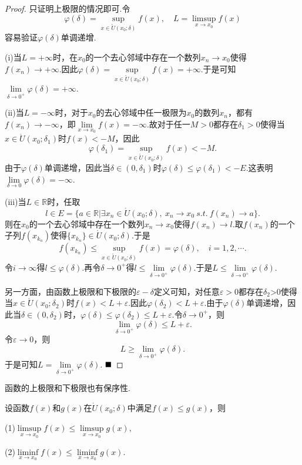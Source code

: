 \begin{proof}
	只证明上极限的情况即可.令
	$$\varphi(\delta)=\sup\limits_{x\in \mathring{U}(x_0;\delta)}f(x),\quad L=\limsup\limits_{x\to x_0}f(x)$$
	容易验证$\varphi(\delta)$单调递增.
	
	(i)当$L=+\infty$时，在$x_0$的一个去心邻域中存在一个数列$x_n\to x_0$使得$f(x_n)\to +\infty$.因此$\varphi(\delta)=\sup\limits_{x\in \mathring{U}(x_0;\delta)}f(x)=+\infty$.于是可知$\lim\limits_{\delta\to 0^+}\varphi(\delta)=+\infty$.
	
	(ii)当$L=-\infty$时，对于$x_0$的去心邻域中任一极限为$x_0$的数列$x_n$，都有$f(x_n)\to -\infty$，即$\lim\limits_{x\to x_0}f(x)=-\infty$.故对于任一$M>0$都存在$\delta_1>0$使得当$x\in\mathring{U}(x_0;\delta_1)$时$f(x)<-M$，因此
	$$\varphi(\delta_1)=\sup\limits_{x\in \mathring{U}(x_0;\delta)}f(x)<-M.$$
	由于$\varphi(\delta)$单调递增，因此当$\delta\in(0,\delta_1)$时$\varphi(\delta)\leqslant\varphi(\delta_1)<-E$.这表明$\lim\limits_{\delta\to 0}\varphi(\delta)=-\infty$.
	
	(iii)当$L\in\mathbb{R}$时，任取
	$$l\in E=\{a\in\mathbb{R}|\exists x_n\in\mathring{U}(x_0;\delta),\ x_n\to x_0\ s.t.\ f(x_n)\to a\}.$$
	则在$x_0$的一个去心邻域中存在一个数列$x_n\to x_0$使得$f(x_n)\to l$.取$f(x_n)$的一个子列$f(x_{k_n})$使得$\{x_{k_n}\}\in\mathring{U}(x_0;\delta)$.于是
	$$f(x_{k_n})\leqslant \sup\limits_{x\in \mathring{U}(x_0;\delta)}f(x)=\varphi(\delta),\quad i=1,2,\cdots.$$
	令$i\to\infty$得$l\leqslant\varphi(\delta)$.再令$\delta\to 0^+$得$l\leqslant\lim\limits_{\delta\to 0^+}\varphi(\delta)$.于是$L\leqslant\lim\limits_{\delta\to 0^+}\varphi(\delta)$.
	
	另一方面，由函数上极限和下极限的$\varepsilon-\delta$定义可知，对任意$\varepsilon>0$都存在$\delta_2$>0使得当$x\in\mathring{U}(x_0;\delta_2)$时$f(x)<L+\varepsilon$.因此$\varphi(\delta_2)<L+\varepsilon$.由于$\varphi(\delta)$单调递增，因此当$\delta\in(0,\delta_2)$时，$\varphi(\delta)\leqslant\varphi(\delta_2)\leqslant L+\varepsilon$.令$\delta\to 0^+$，则
	$$\lim\limits_{\delta\to 0^+}\varphi(\delta)\leqslant L+\varepsilon.$$
	令$\varepsilon\to 0$，则
	$$L\geqslant\lim\limits_{\delta\to 0^+}\varphi(\delta).$$
	于是可知$L=\lim\limits_{\delta\to 0^+}\varphi(\delta)$.
	$\hfill\blacksquare$
\end{proof}
函数的上极限和下极限也有保序性.
\begin{theorem}[保序性]
	设函数$f(x)$和$g(x)$在$\mathring{U}(x_0;\delta)$中满足$f(x)\leqslant g(x)$，则
	
	(1)$\limsup\limits_{x\to x_0}f(x)\leqslant\limsup\limits_{x\to x_0}g(x),$
	
	(2)$\liminf\limits_{x\to x_0}f(x)\leqslant\liminf\limits_{x\to x_0}g(x).$
\end{theorem}
